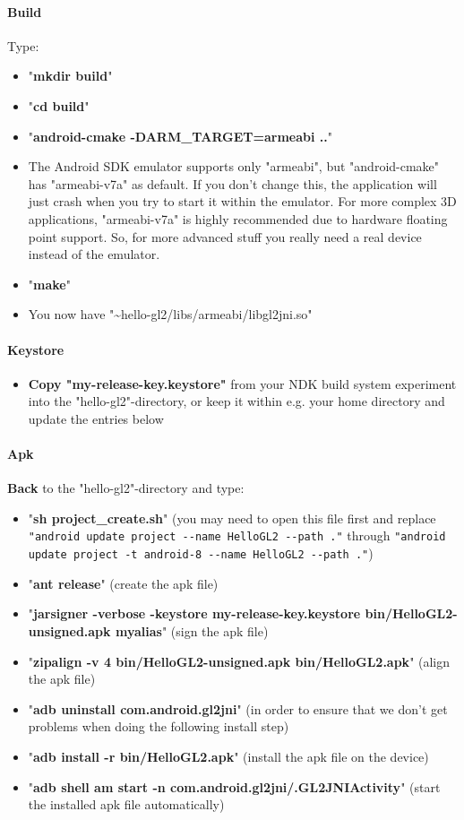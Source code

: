 \paragraph{Build}
Type:
\begin{itemize}
\item{"\textbf{mkdir build}"}
\item{"\textbf{cd build}"}
\item{"\textbf{android-cmake -DARM\_TARGET=armeabi ..}"}
\item{\textrightarrow  The Android SDK emulator supports only "armeabi", but "android-cmake" has "armeabi-v7a" as default. If you don't change this, the application will just crash when you try to start it within the emulator. For more complex 3D applications, "armeabi-v7a" is highly recommended due to hardware floating point support. So, for more advanced stuff you really need a real device instead of the emulator.}
\item{"\textbf{make}"}
\item{\textrightarrow  You now have "\textasciitilde hello-gl2/libs/armeabi/libgl2jni.so"}
\end{itemize}


\paragraph{Keystore}
\begin{itemize}
\item{\textbf{Copy "my-release-key.keystore"} from your NDK build system experiment into the "hello-gl2"-directory, or keep it within e.g. your home directory and update the entries below}
\end{itemize}


\paragraph{Apk}
\textbf{Back} to the "hello-gl2"-directory and type:
\begin{itemize}
\item{"\textbf{sh project\_create.sh}" (you may need to open this file first and replace \verb+"android update project --name HelloGL2 --path ."+ through \verb+"android update project -t android-8 --name HelloGL2 --path ."+)}
\item{"\textbf{ant release}" (create the apk file)}
\item{"\textbf{jarsigner -verbose -keystore my-release-key.keystore bin/HelloGL2-unsigned.apk myalias}" (sign the apk file)}
\item{"\textbf{zipalign -v 4 bin/HelloGL2-unsigned.apk bin/HelloGL2.apk}" (align the apk file)}
\item{"\textbf{adb uninstall com.android.gl2jni}" (in order to ensure that we don't get problems when doing the following install step)}
\item{"\textbf{adb install -r bin/HelloGL2.apk}" (install the apk file on the device)}
\item{"\textbf{adb shell am start -n com.android.gl2jni/.GL2JNIActivity}" (start the installed apk file automatically)}
\end{itemize}



